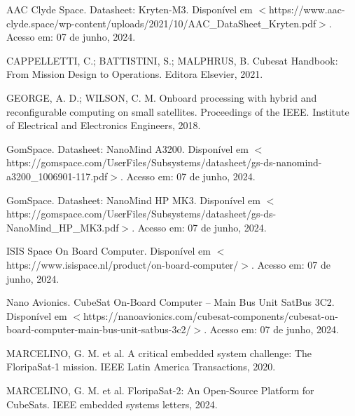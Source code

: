\begin{flushleft}
\begin{thebibliography}{00}
 AAC Clyde Space. Datasheet: Kryten-M3. Disponível em $<$https://www.aac-clyde.space/wp-content/uploads/2021/10/AAC\_DataSheet\_Kryten.pdf$>$.  Acesso em: 07 de junho, 2024.

 CAPPELLETTI, C.; BATTISTINI, S.; MALPHRUS, B. Cubesat Handbook: From Mission Design to Operations. Editora Elsevier, 2021.

 GEORGE, A. D.; WILSON, C. M. Onboard processing with hybrid and reconfigurable computing on small satellites. Proceedings of the IEEE. Institute of Electrical and Electronics Engineers, 2018.

 GomSpace. Datasheet: NanoMind A3200. Disponível em $<$https://gomspace.com/UserFiles/Subsystems/datasheet/gs-ds-nanomind-a3200\_1006901-117.pdf$>$. Acesso em: 07 de junho, 2024.

 GomSpace. Datasheet: NanoMind HP MK3. Disponível em $<$https://gomspace.com/UserFiles/Subsystems/datasheet/gs-ds-NanoMind\_HP\_MK3.pdf$>$. Acesso em: 07 de junho, 2024.

 ISIS Space On Board Computer. Disponível em $<$https://www.isispace.nl/product/on-board-computer/$>$. Acesso em: 07 de junho, 2024.

 Nano Avionics. CubeSat On-Board Computer – Main Bus Unit SatBus 3C2. Disponível em $<$https://nanoavionics.com/cubesat-components/cubesat-on-board-computer-main-bus-unit-satbus-3c2/$>$. Acesso em: 07 de junho, 2024.

 MARCELINO, G. M. et al. A critical embedded system challenge: The FloripaSat-1 mission. IEEE Latin America Transactions, 2020.

 MARCELINO, G. M. et al. FloripaSat-2: An Open-Source Platform for CubeSats. IEEE embedded systems letters, 2024.
\end{thebibliography}
\end{flushleft}

